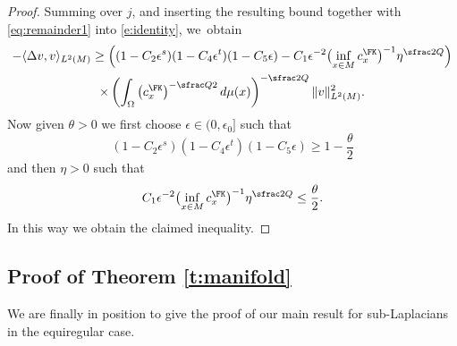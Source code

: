 \begin{proof}
Summing over $j$, and inserting the resulting bound together with \eqref{eq:remainder1} into \eqref{e:identity}, we~obtain
\begin{multline*}
- \langle \Delta v, v \rangle_{L^2(M)}\geq \Bigl((1-C_2 \epsilon^s)(1-C_4 \epsilon^t) (1-C_5\epsilon) - C_1 \epsilon^{-2} \bigl(\inf_{x\in M} c_x^\FK \bigr)^{-1} \eta^{\sfrac2Q} \Bigr) \\
\times \left(\int_\Omega \left(c^\FK_x\right)^{-\sfrac Q2} d\mu(x)\right)^{-\sfrac 2Q} \| v \|_{L^2(M)}^2.
\end{multline*}
Now given $\theta>0$ we first choose $\epsilon\in(0,\epsilon_0]$ such that
\[
(1-C_2 \epsilon^s)(1-C_4 \epsilon^t) (1-C_5\epsilon) \geq 1- \frac{\theta}{2}
\]
and then $\eta>0$ such that
\[
C_1 \epsilon^{-2} \bigl(\inf_{x\in M} c_x^\FK \bigr)^{-1} \eta^{\sfrac2Q} \leq \frac{\theta}{2}.
\]
In this way we obtain the claimed inequality.
\end{proof}

\subsection{Proof of Theorem \ref{t:manifold}}
We are finally in position to give the proof of our main result for sub-Laplacians in the equiregular case.


